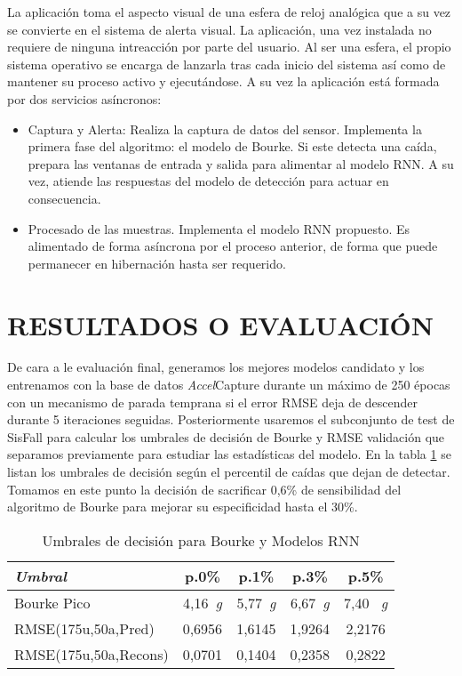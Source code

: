 \documentclass[11pt,a4paper,spanish,twocolumn]{article}
\def\accelcapture/{\textsl{\textsf{Accel}}\textsf{Capture}}
\def\g/{~\textsl{g}}
\begin{document}
La aplicación toma el aspecto visual de una esfera de reloj analógica que a su vez se convierte en el sistema de alerta visual. La aplicación, una vez instalada no requiere de ninguna intreacción por parte del usuario. Al ser una esfera, el propio sistema operativo se encarga de lanzarla tras cada inicio del sistema así como de mantener su proceso activo y ejecutándose. A su vez la aplicación está formada por dos servicios asíncronos:
\begin{itemize}
  \item Captura y Alerta: Realiza la captura de datos del sensor. Implementa la primera fase del algoritmo: el modelo de Bourke.  Si este detecta una caída, prepara las ventanas de entrada y salida para alimentar al modelo RNN. A su vez, atiende las respuestas del modelo de detección para actuar en consecuencia.
  \item Procesado de las muestras. Implementa el modelo RNN propuesto. Es alimentado de forma asíncrona por el proceso anterior, de forma que puede permanecer en hibernación hasta ser requerido.
\end{itemize}

\section{RESULTADOS O EVALUACIÓN }

De cara a le evaluación final, generamos los mejores modelos candidato y los entrenamos con la base de datos \accelcapture/ durante un máximo de 250 épocas con un mecanismo de parada temprana si el error RMSE deja de descender durante 5 iteraciones seguidas. Posteriormente usaremos el subconjunto de test de SisFall para calcular los umbrales de decisión de Bourke y RMSE  validación que separamos previamente para estudiar las estadísticas del modelo. En la tabla \ref{tab:umbrales} se listan los umbrales de decisión según el percentil de caídas que dejan de detectar. Tomamos en este punto la decisión de sacrificar 0,6\% de sensibilidad del algoritmo de Bourke para mejorar su especificidad hasta el 30\%.

\begin{table}\caption{\label{tab:umbrales}Umbrales de decisión para Bourke y Modelos RNN}
  \begin{tabular}{lcccc}\toprule
    \emph{Umbral}   & p.0\% & p.1\%  & p.3\%  & p.5\%  \\ \midrule
    Bourke Pico  & 4,16\g/ & 5,77\g/ & 6,67\g/ & 7,40 \g/ \\
    RMSE(175u,50a,Pred) & 0,6956 & 1,6145 & 1,9264 & 2,2176  \\
    RMSE(175u,50a,Recons) & 0,0701 & 0,1404 & 0,2358 & 0,2822 \\ \bottomrule
  \end{tabular}
\end{table}
\end{document}
